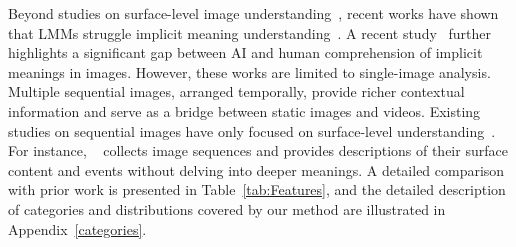 Beyond studies on surface-level image understanding~\cite{antol2015vqa, wang2022co, dong-etal-2022-premise, xia-etal-2023-imagenetvc}, recent works have shown that LMMs struggle implicit meaning understanding~\cite{desai2021nice, abu-farha-etal-2022-semeval, Hu2024CrackingTC}.
A recent study~\cite{yang2024:deepsemantic} further highlights a significant gap between AI and human comprehension of implicit meanings in images. However, these works are limited to single-image analysis. Multiple sequential images, arranged temporally, provide richer contextual information and serve as a bridge between static images and videos. Existing studies on sequential images have only focused on surface-level understanding~\cite{chen2024autoeval, wang2024mementos}. 
For instance, ~\citet{wang2024mementos} collects image sequences and provides descriptions of their surface content and events without delving into deeper meanings. A detailed comparison with prior work is presented in Table~\ref{tab:Features}, and the detailed description of categories and distributions covered by our method are illustrated in Appendix~\ref{categories}.


